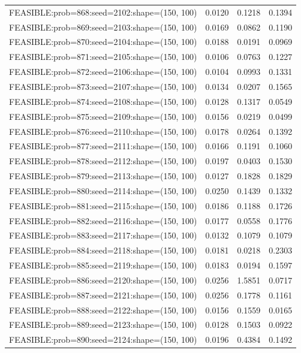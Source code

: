 \begin{longtable}{lccc}
FEASIBLE:prob=868:seed=2102:shape=(150, 100) & 0.0120 & 0.1218 & 0.1394 \\
FEASIBLE:prob=869:seed=2103:shape=(150, 100) & 0.0169 & 0.0862 & 0.1190 \\
FEASIBLE:prob=870:seed=2104:shape=(150, 100) & 0.0188 & 0.0191 & 0.0969 \\
FEASIBLE:prob=871:seed=2105:shape=(150, 100) & 0.0106 & 0.0763 & 0.1227 \\
FEASIBLE:prob=872:seed=2106:shape=(150, 100) & 0.0104 & 0.0993 & 0.1331 \\
FEASIBLE:prob=873:seed=2107:shape=(150, 100) & 0.0134 & 0.0207 & 0.1565 \\
FEASIBLE:prob=874:seed=2108:shape=(150, 100) & 0.0128 & 0.1317 & 0.0549 \\
FEASIBLE:prob=875:seed=2109:shape=(150, 100) & 0.0156 & 0.0219 & 0.0499 \\
FEASIBLE:prob=876:seed=2110:shape=(150, 100) & 0.0178 & 0.0264 & 0.1392 \\
FEASIBLE:prob=877:seed=2111:shape=(150, 100) & 0.0166 & 0.1191 & 0.1060 \\
FEASIBLE:prob=878:seed=2112:shape=(150, 100) & 0.0197 & 0.0403 & 0.1530 \\
FEASIBLE:prob=879:seed=2113:shape=(150, 100) & 0.0127 & 0.1828 & 0.1829 \\
FEASIBLE:prob=880:seed=2114:shape=(150, 100) & 0.0250 & 0.1439 & 0.1332 \\
FEASIBLE:prob=881:seed=2115:shape=(150, 100) & 0.0186 & 0.1188 & 0.1726 \\
FEASIBLE:prob=882:seed=2116:shape=(150, 100) & 0.0177 & 0.0558 & 0.1776 \\
FEASIBLE:prob=883:seed=2117:shape=(150, 100) & 0.0132 & 0.1079 & 0.1079 \\
FEASIBLE:prob=884:seed=2118:shape=(150, 100) & 0.0181 & 0.0218 & 0.2303 \\
FEASIBLE:prob=885:seed=2119:shape=(150, 100) & 0.0183 & 0.0194 & 0.1597 \\
FEASIBLE:prob=886:seed=2120:shape=(150, 100) & 0.0256 & 1.5851 & 0.0717 \\
FEASIBLE:prob=887:seed=2121:shape=(150, 100) & 0.0256 & 0.1778 & 0.1161 \\
FEASIBLE:prob=888:seed=2122:shape=(150, 100) & 0.0156 & 0.1559 & 0.0165 \\
FEASIBLE:prob=889:seed=2123:shape=(150, 100) & 0.0128 & 0.1503 & 0.0922 \\
FEASIBLE:prob=890:seed=2124:shape=(150, 100) & 0.0196 & 0.4384 & 0.1492 \\

\end{longtable}
